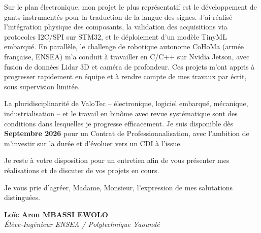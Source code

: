 \documentclass[a4paper,11pt]{article}
\begin{document}
Sur le plan électronique, mon projet le plus représentatif est le développement de gants instrumentés pour la traduction de la langue des signes. J'ai réalisé l'intégration physique des composants, la validation des acquisitions via protocoles I2C/SPI sur STM32, et le déploiement d'un modèle TinyML embarqué. En parallèle, le challenge de robotique autonome CoHoMa (armée française, ENSEA) m'a conduit à travailler en C/C++ sur Nvidia Jetson, avec fusion de données Lidar 3D et caméra de profondeur. Ces projets m'ont appris à progresser rapidement en équipe et à rendre compte de mes travaux par écrit, sous supervision limitée.

La pluridisciplinarité de ValoTec -- électronique, logiciel embarqué, mécanique, industrialisation -- et le travail en binôme avec revue systématique sont des conditions dans lesquelles je progresse efficacement. Je suis disponible dès \textbf{Septembre 2026} pour un Contrat de Professionnalisation, avec l'ambition de m'investir sur la durée et d'évoluer vers un CDI à l'issue.

Je reste à votre disposition pour un entretien afin de vous présenter mes réalisations et de discuter de vos projets en cours.

Je vous prie d'agréer, Madame, Monsieur, l'expression de mes salutations distinguées.

\vspace{0.8cm}

\textbf{Loïc Aron MBASSI EWOLO}\\
\textit{Élève-Ingénieur ENSEA / Polytechnique Yaoundé}
\end{document}
